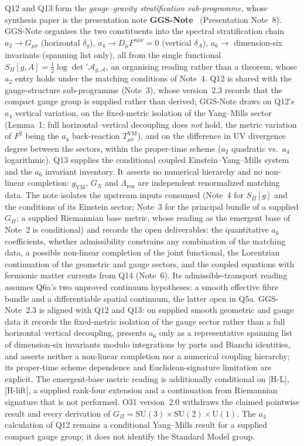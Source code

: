 \documentclass[11pt,a4paper]{article}
\newcommand{\SU}{\mathrm{SU}}
\begin{document}
    Q12 and Q13 form the \emph{gauge--gravity stratification sub-programme}, whose synthesis
    paper is the presentation note
    \textbf{GGS-Note}~\cite{Beau2026ggsnote} (Presentation Note~8).
    GGS-Note organises the two constituents into the spectral stratification chain
    $a_2 \to G_{\mu\nu}$ (horizontal $\delta_g$),
    $a_4 \to D_\mu F^{a\mu\nu} = 0$ (vertical $\delta_A$),
    $a_6 \to$ dimension-six invariants (spanning list only),
    all from the single functional
    $S_\Pi[g,A] = \tfrac{1}{2}\log\det'\mathcal{A}_{g,\mathcal{A}}$, an organising reading rather than a theorem,
    whose $a_2$ entry holds under the matching conditions of Note~4.
    Q12 is shared with the gauge-structure sub-programme (Note~3), whose version~2.3 records that
    the compact gauge group is supplied rather than derived; GGS-Note draws on Q12's $a_4$ vertical
    variation, on the
    fixed-metric isolation of the Yang--Mills sector (Lemma~1; full horizontal--vertical
    decoupling does \emph{not} hold, the metric variation of $F^2$ being the $a_4$
    back-reaction $T^{\mathrm{YM}}_{\mu\nu}$), and on the difference in UV divergence degree
    between the sectors, within the proper-time scheme ($a_2$ quadratic vs.\ $a_4$ logarithmic).
    Q13 supplies the conditional coupled Einstein--Yang--Mills system and the $a_6$ invariant
    inventory. It asserts no numerical hierarchy and no non-linear completion: $g_{\mathrm{YM}}$,
    $G_N$ and $\Lambda_{\mathrm{ren}}$ are independent renormalized matching data.
    The note isolates the upstream inputs consumed (Note~4 for $S_\Pi[g]$ and the conditions of its Einstein
    sector; Note~3 for the principal bundle of a supplied $G_\Pi$; a supplied Riemannian base metric, whose
    reading as the emergent base of Note~2 is conditional) and records the open deliverables: the quantitative
    $a_6$ coefficients, whether admissibility constrains any combination of the matching data, a possible
    non-linear completion of the joint functional, the Lorentzian continuation of the geometric and gauge
    sectors, and the coupled equations with fermionic matter currents from Q14 (Note~6).
    Its admissible-transport reading assumes Q6a's two unproved continuum hypotheses: a smooth
    effective fibre bundle and a differentiable spatial continuum, the latter open in Q5a.
    GGS-Note~2.3 is aligned with Q12 and Q13: on supplied smooth geometric and gauge data it records
    the fixed-metric isolation of the gauge
    sector rather than a full horizontal--vertical decoupling, presents $a_6$ only as a
    representative spanning list of dimension-six invariants modulo integrations by parts and
    Bianchi identities, and asserts neither a non-linear completion nor a numerical coupling
    hierarchy; its proper-time scheme dependence and Euclidean-signature limitation are explicit.
    The emergent-base metric reading is additionally conditional on [H-L], [H-lift], a supplied rank-four extension and a
    continuation from Riemannian signature that is not performed.
    O31 version~2.0 withdraws the claimed pointwise result and every derivation of
    $G_\Pi = \SU(3) \times \SU(2) \times \mathrm{U}(1)$. The $a_4$ calculation of Q12 remains
    a conditional Yang--Mills result for a supplied compact gauge group; it does not identify the
    Standard Model group.
\end{document}
